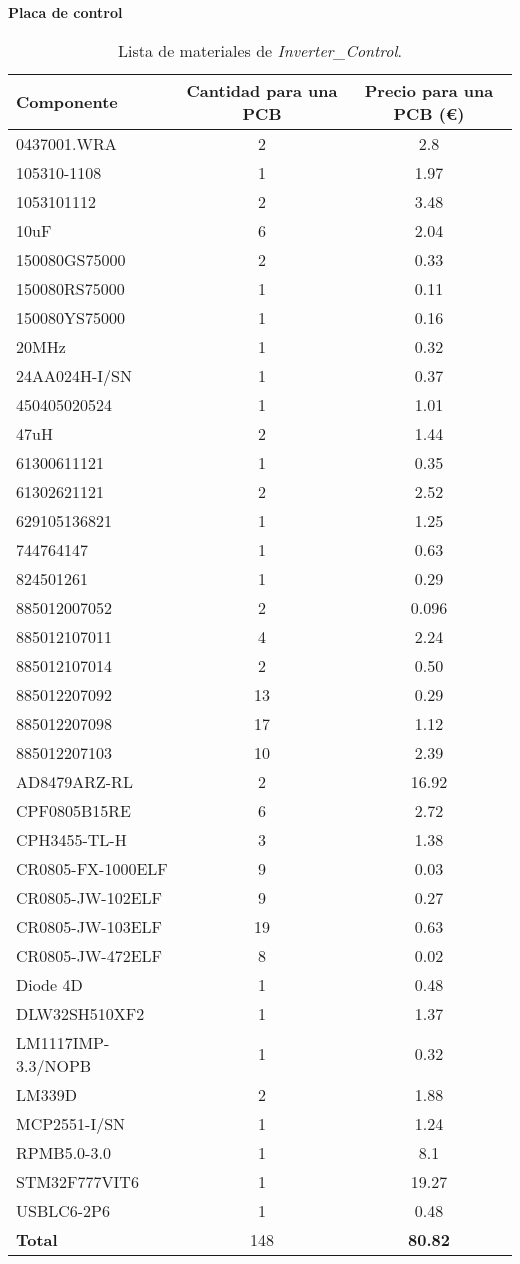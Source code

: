 \newpage
\textbf{Placa de control}
\begin{table}[H]
	\centering
	\begin{tabular}{|l|c|c|}
		\hline
		\textbf{Componente} & \textbf{Cantidad para una PCB} & \textbf{Precio para una PCB (\euro{})} \\
		\hline
		0437001.WRA & 2 & 2.8 \\
		105310-1108 & 1 & 1.97 \\
		1053101112 & 2 & 3.48 \\
		10uF & 6 & 2.04 \\
		150080GS75000 & 2 & 0.33 \\
		150080RS75000 & 1 & 0.11 \\
		150080YS75000 & 1 & 0.16 \\
		20MHz & 1 & 0.32 \\
		24AA024H-I/SN & 1 & 0.37 \\
		450405020524 & 1 & 1.01 \\
		47uH & 2 & 1.44 \\
		61300611121 & 1 & 0.35 \\
		61302621121 & 2 & 2.52 \\
		629105136821 & 1 & 1.25 \\
		744764147 & 1 & 0.63 \\
		824501261 & 1 & 0.29 \\
		885012007052 & 2 & 0.096 \\
		885012107011 & 4 & 2.24 \\
		885012107014 & 2 & 0.50 \\
		885012207092 & 13 & 0.29 \\
		885012207098 & 17 & 1.12 \\
		885012207103 & 10 & 2.39 \\
		AD8479ARZ-RL & 2 & 16.92 \\
		CPF0805B15RE & 6 & 2.72 \\
		CPH3455-TL-H & 3 & 1.38 \\
		CR0805-FX-1000ELF & 9 & 0.03 \\
		CR0805-JW-102ELF & 9 & 0.27 \\
		CR0805-JW-103ELF & 19 & 0.63 \\
		CR0805-JW-472ELF & 8 & 0.02 \\
		Diode 4D & 1 & 0.48 \\
		DLW32SH510XF2 & 1 & 1.37 \\
		LM1117IMP-3.3/NOPB & 1 & 0.32 \\
		LM339D & 2 & 1.88 \\
		MCP2551-I/SN & 1 & 1.24 \\
		RPMB5.0-3.0 & 1 & 8.1 \\
		STM32F777VIT6 & 1 & 19.27 \\
		USBLC6-2P6 & 1 & 0.48 \\
		\hline
		\textbf{Total} & 148 & \textbf{80.82} \\
		\hline
	\end{tabular}
	\caption{Lista de materiales de \textit{Inverter\_Control}.}
\end{table}

